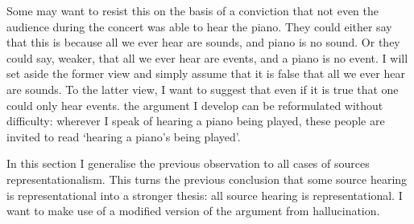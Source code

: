 \documentclass[sloppy, journal, git, bytitle, dodraft]{humapap}
\begin{document}
 
Some may want to resist this on the basis of a conviction that not even the audience during the concert was able to hear the piano. They could either say that this is because all we ever hear are sounds, and piano is no sound. Or they could say, weaker, that all we ever hear are events, and a piano is no event. I will set aside the former view and simply assume that it is false that all we ever hear are sounds. To the latter view, I want to suggest that even if it is true that one could only hear events. the argument I develop can be reformulated without difficulty: wherever I speak of hearing a piano being played, these people are invited to read `hearing a piano's being played'.

\sect


\sect In this section I generalise the previous observation to all cases of sources representationalism. This turns the previous conclusion that some source hearing is representational into a stronger thesis: all source hearing is representational. I want to make use of a modified version of the argument from hallucination. 
\end{document}
